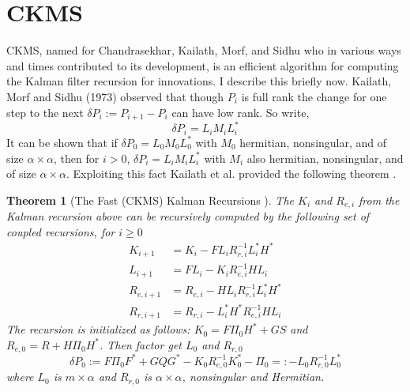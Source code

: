 \documentclass[12pt]{amsart}
\newtheorem{theorem}{Theorem}
\begin{document}
\appendix

\section{CKMS}

CKMS, named for Chandrasekhar, Kailath, Morf, and Sidhu who in various ways and times contributed to its development, is an efficient algorithm for computing the Kalman filter recursion for innovations. I describe this briefly now. Kailath, Morf and Sidhu (1973) observed that though $P_i$ is full rank the change for one step to the next $\delta P_i := P_{i+1} - P_i$ can have low rank. So write,
	$$\delta P_i = L_iM_iL_i^*$$
It can be shown that if $\delta P_0 = L_0M_0L_0^*$ with $M_0$ hermitian, nonsingular, and of size $\alpha\times \alpha$, then for $i>0$, $\delta P_i = L_iM_iL_i^*$ with $M_i$ also hermitian, nonsingular, and of size $\alpha\times \alpha$. Exploiting this fact Kailath et al. provided the following theorem \cite[p.~409]{sayed2001}.
\begin{theorem}[The Fast (CKMS) Kalman Recursions ]
	The $K_{i}$ and $R_{e,i}$ from the Kalman recursion above can be recursively computed by the following set of coupled recursions, for $i\ge 0$
	\begin{align*}
	K_{i+1} &= K_{i} - FL_iR_{r,i}^{-1}L_i^*H^* \\
	L_{i+1} &= FL_{i} - K_{i}R_{e,i}^{-1}HL_i \\
	R_{e,i+1} &= R_{e,i} - HL_iR_{r,i}^{-1}L_i^*H^* \\
	R_{r,i+1} &= R_{r,i} - L_i^*H^*R_{e,i}^{-1}HL_i
	\end{align*}
	The recursion is initialized as follows: $K_{0} = F\Pi_0H^* + GS$ and $R_{e,0} = R+H\Pi_0H^*$. Then factor get $L_0$ and  $R_{r,0}$
	$$\delta P_0 := F\Pi_0F^* + GQG^* - K_{0}R_{e,0}^{-1}K_{0}^* - \Pi_0=:-L_0R_{r,0}^{-1}L_0^*$$ where $L_0$ is $m \times \alpha$ and $R_{r,0}$ is $\alpha \times \alpha$, nonsingular and Hermitian. 
\end{theorem}
\end{document}
